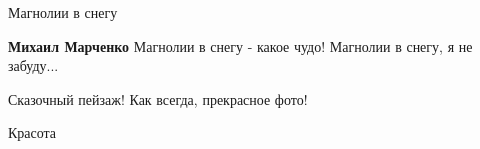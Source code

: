  
 
 
 
 

Магнолии в снегу

\textbf{Михаил Марченко} Магнолии в снегу -
какое чудо!
Магнолии в снегу, я не забуду...

Сказочный пейзаж! Как всегда, прекрасное фото!

Красота

